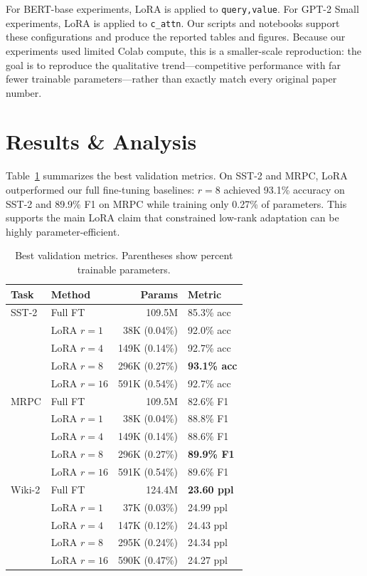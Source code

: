 \documentclass[11pt,twocolumn]{article}
\begin{document}
For BERT-base experiments, LoRA is applied to \texttt{query,value}. For GPT-2 Small experiments, LoRA is applied to \texttt{c\_attn}. Our scripts and notebooks support these configurations and produce the reported tables and figures. Because our experiments used limited Colab compute, this is a smaller-scale reproduction: the goal is to reproduce the qualitative trend---competitive performance with far fewer trainable parameters---rather than exactly match every original paper number.

\section{Results \& Analysis}
Table~\ref{tab:results} summarizes the best validation metrics. On SST-2 and MRPC, LoRA outperformed our full fine-tuning baselines: $r=8$ achieved 93.1\% accuracy on SST-2 and 89.9\% F1 on MRPC while training only 0.27\% of parameters. This supports the main LoRA claim that constrained low-rank adaptation can be highly parameter-efficient.

\begin{table}[H]
\centering
\caption{Best validation metrics. Parentheses show percent trainable parameters.}
\label{tab:results}
\setlength{\tabcolsep}{2.5pt}
\renewcommand{\arraystretch}{0.98}
{\small
\begin{tabular}{@{}llrl@{}}
\toprule
\textbf{Task} & \textbf{Method} & \textbf{Params} & \textbf{Metric} \\
\midrule
SST-2 & Full FT & 109.5M & 85.3\% acc \\
      & LoRA $r=1$  & 38K (0.04\%) & 92.0\% acc \\
      & LoRA $r=4$  & 149K (0.14\%) & 92.7\% acc \\
      & LoRA $r=8$  & 296K (0.27\%) & \textbf{93.1\% acc} \\
      & LoRA $r=16$ & 591K (0.54\%) & 92.7\% acc \\
\midrule
MRPC  & Full FT & 109.5M & 82.6\% F1 \\
      & LoRA $r=1$  & 38K (0.04\%) & 88.8\% F1 \\
      & LoRA $r=4$  & 149K (0.14\%) & 88.6\% F1 \\
      & LoRA $r=8$  & 296K (0.27\%) & \textbf{89.9\% F1} \\
      & LoRA $r=16$ & 591K (0.54\%) & 89.6\% F1 \\
\midrule
Wiki-2 & Full FT & 124.4M & \textbf{23.60 ppl} \\
       & LoRA $r=1$  & 37K (0.03\%) & 24.99 ppl \\
       & LoRA $r=4$  & 147K (0.12\%) & 24.43 ppl \\
       & LoRA $r=8$  & 295K (0.24\%) & 24.34 ppl \\
       & LoRA $r=16$ & 590K (0.47\%) & 24.27 ppl \\
\bottomrule
\end{tabular}}
\end{table}
\end{document}
